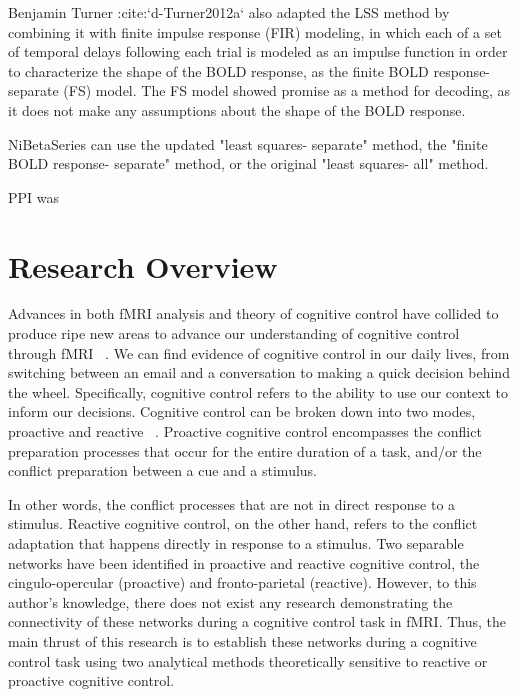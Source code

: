 \documentclass[phd,appendix,figures]{uithesis}
\begin{document}
Benjamin Turner :cite:`d-Turner2012a` also adapted the LSS method by combining
it with finite impulse response (FIR) modeling, in which each of a set of
temporal delays following each trial is modeled as an impulse function in order
to characterize the shape of the BOLD response, as the
finite BOLD response- separate (FS) model.
The FS model showed promise as a method for decoding, as it does not make any
assumptions about the shape of the BOLD response.

NiBetaSeries can use the updated "least squares- separate" method,
the "finite BOLD response- separate" method, or the original
"least squares- all" method.


PPI was 



\chapter{Research Overview}

Advances in both fMRI analysis and theory of cognitive control have collided to produce ripe new areas to advance our understanding of cognitive control through fMRI ~\citep{Braver2012,Rissman2004,Mumford2012,Cisler2012}.
We can find evidence of cognitive control in our daily lives, from switching between an email and a conversation to making a quick decision behind the wheel. 
Specifically, cognitive control refers to the ability to use our context to inform our decisions. Cognitive control can be broken down into two modes, proactive and reactive ~\citep{Braver2012}. 
Proactive cognitive control encompasses the conflict preparation processes that occur for the entire duration of a task, and/or the conflict preparation between a cue and a stimulus.

In other words, the conflict processes that are not in direct response to a stimulus.
Reactive cognitive control, on the other hand, refers to the conflict adaptation that happens directly in response to a stimulus.
Two separable networks have been identified in proactive and reactive cognitive control, the cingulo-opercular (proactive) and fronto-parietal (reactive).
However, to this author's knowledge, there does not exist any research demonstrating the connectivity of these networks during a cognitive control task in fMRI.
Thus, the main thrust of this research is to establish these networks during a cognitive control task using two analytical methods theoretically sensitive to reactive or proactive cognitive control.
\end{document}
